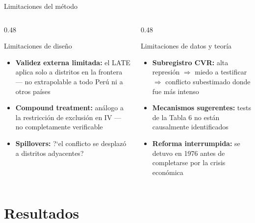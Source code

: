 \documentclass[aspectratio=169,t]{beamer}
\begin{document}
\begin{frame}{Limitaciones del m\'etodo}
\begin{columns}[T]
  \begin{column}{0.48\textwidth}
    \begin{alertblock}{Limitaciones de dise\~no}
    \small\begin{itemize}
      \item \textbf{Validez externa limitada:}
            el LATE aplica solo a distritos en la
            frontera --- no extrapolable a todo
            Per\'u ni a otros pa\'ises
      \item \textbf{Compound treatment:}
            an\'alogo a la restricci\'on de exclusi\'on
            en IV --- no completamente verificable
      \item \textbf{Spillovers:} ?`el conflicto
            se desplaz\'o a distritos adyacentes?
    \end{itemize}
    \end{alertblock}
  \end{column}
  \begin{column}{0.48\textwidth}
    \begin{alertblock}{Limitaciones de datos y teor\'ia}
    \small\begin{itemize}
      \item \textbf{Subregistro CVR:}
            alta represi\'on $\Rightarrow$ miedo a
            testificar $\Rightarrow$ conflicto
            subestimado donde fue m\'as intenso
      \item \textbf{Mecanismos sugerentes:}
            tests de la Tabla 6 no est\'an
            causalmente identificados
      \item \textbf{Reforma interrumpida:}
            se detuvo en 1976 antes de completarse
            por la crisis econ\'omica
    \end{itemize}
    \end{alertblock}
  \end{column}
\end{columns}
\end{frame}

\section{Resultados}
\end{document}
